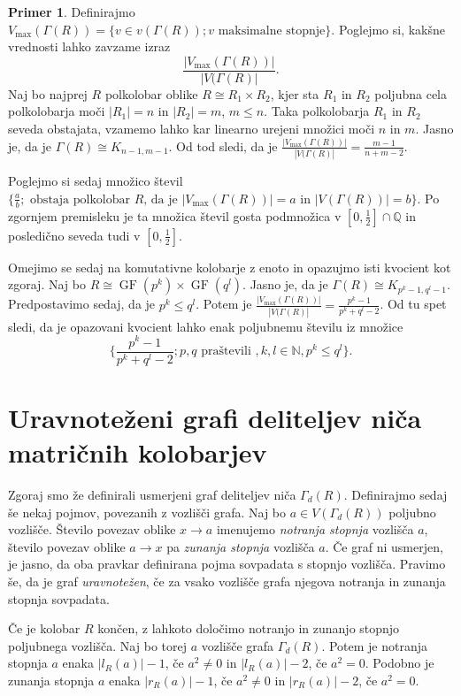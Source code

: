 \documentclass[a4paper, 12pt]{amsart}
\theoremstyle{definition} %
\newtheorem{primer}[definicija]{Primer}
\theoremstyle{plain} %
\newcommand{\N}{\mathbb N}
\newcommand{\Q}{\mathbb Q}
\DeclareMathOperator{\GF}{GF}
\begin{document}
\begin{primer}
Definirajmo $V_{\max} (\Gamma(R)) = \{v\in v(\Gamma(R)); v \textrm{ maksimalne stopnje}\}$. Poglejmo si, kakšne vrednosti lahko zavzame izraz 
$$
\frac{|V_{\max}(\Gamma(R))|}{|V(\Gamma(R)|}.
$$
Naj bo najprej $R$ polkolobar oblike $R \cong R_1 \times R_2$, kjer sta $R_1$ in $R_2$ poljubna cela polkolobarja moči $|R_1| = n$ in $|R_2| = m$, $m \le n$. Taka polkolobarja $R_1$ in $R_2$ seveda obstajata, vzamemo lahko kar linearno urejeni množici moči $n$ in $m$. Jasno je, da je $\Gamma(R) \cong K_{n-1,m-1}$. Od tod sledi, da je $\frac{|V_{\max}(\Gamma(R))|}{|V(\Gamma(R)|} = \frac{m-1}{n+m-2}$. 

Poglejmo si sedaj množico števil $\{\frac{a}{b}; \textrm{ obstaja polkolobar } R \textrm{, da je } |V_{\max}(\Gamma(R))| = a \textrm{ in } |V(\Gamma(R))| = b \}$. Po zgornjem premisleku je ta množica števil gosta podmnožica v $[0, \frac{1}{2}]\cap\Q$ in posledično seveda tudi v $[0,\frac{1}{2}]$.

Omejimo se sedaj na komutativne kolobarje z enoto in opazujmo isti kvocient kot zgoraj. Naj bo $R\cong \GF(p^k) \times \GF(q^l)$. Jasno je, da je $\Gamma(R) \cong K_{p^k - 1, q^l -1}$. Predpostavimo sedaj, da je $p^k \le q^l$. Potem je $\frac{|V_{\max}(\Gamma(R))|}{|V(\Gamma(R)|} = \frac{p^k - 1}{p^k + q^l -2}$. Od tu spet sledi, da je opazovani kvocient lahko enak poljubnemu številu iz množice
$$
\Big\{\frac{p^k - 1}{p^k + q^l -2}; p,q \textrm{ praštevili }, k,l \in \N, p^k \le q^l\Big\}.
$$
\end{primer}

\section{Uravnoteženi grafi deliteljev niča matričnih kolobarjev}

Zgoraj smo že definirali usmerjeni graf deliteljev niča $\Gamma_d(R)$. Definirajmo sedaj še nekaj pojmov, povezanih z vozlišči grafa. Naj bo $a\in V(\Gamma_d(R))$ poljubno vozlišče. Število povezav oblike $x\rightarrow a$ imenujemo \emph{notranja stopnja} vozlišča $a$, število povezav oblike $a\rightarrow x$ pa \emph{zunanja stopnja} vozlišča $a$. Če graf ni usmerjen, je jasno, da oba pravkar definirana pojma sovpadata s stopnjo vozlišča. Pravimo še, da je graf \emph{uravnotežen}, če za vsako vozlišče grafa njegova notranja in zunanja stopnja sovpadata.

Če je kolobar $R$ končen, z lahkoto določimo notranjo in zunanjo stopnjo poljubnega vozlišča. Naj bo torej $a$ vozlišče grafa $\Gamma_d(R)$. Potem je notranja stopnja $a$ enaka $|l_R(a)|-1$, če $a^2 \neq 0$ in $|l_R(a)|-2$, če $a^2 = 0$. Podobno je zunanja stopnja $a$ enaka $|r_R(a)|-1$, če $a^2 \neq 0$ in $|r_R(a)| - 2$, če $a^2 = 0$.
\end{document}
